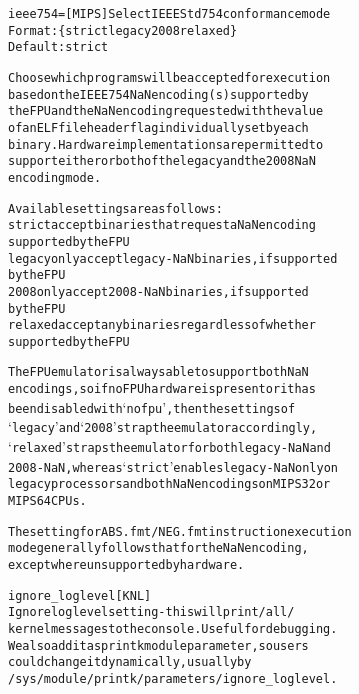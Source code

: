 \documentclass[a4paper,8pt,english]{sphinxmanual}
\begin{document}
\begin{alltt}
        ieee754=        {[}MIPS{]} Select IEEE Std 754 conformance mode
                        Format: \{ strict \textbar{} legacy \textbar{} 2008 \textbar{} relaxed \}
                        Default: strict

                        Choose which programs will be accepted for execution
                        based on the IEEE 754 NaN encoding(s) supported by
                        the FPU and the NaN encoding requested with the value
                        of an ELF file header flag individually set by each
                        binary.  Hardware implementations are permitted to
                        support either or both of the legacy and the 2008 NaN
                        encoding mode.

                        Available settings are as follows:
                        strict  accept binaries that request a NaN encoding
                                supported by the FPU
                        legacy  only accept legacy-NaN binaries, if supported
                                by the FPU
                        2008    only accept 2008-NaN binaries, if supported
                                by the FPU
                        relaxed accept any binaries regardless of whether
                                supported by the FPU

                        The FPU emulator is always able to support both NaN
                        encodings, so if no FPU hardware is present or it has
                        been disabled with `nofpu', then the settings of
                        `legacy' and `2008' strap the emulator accordingly,
                        `relaxed' straps the emulator for both legacy-NaN and
                        2008-NaN, whereas `strict' enables legacy-NaN only on
                        legacy processors and both NaN encodings on MIPS32 or
                        MIPS64 CPUs.

                        The setting for ABS.fmt/NEG.fmt instruction execution
                        mode generally follows that for the NaN encoding,
                        except where unsupported by hardware.

        ignore\_loglevel {[}KNL{]}
                        Ignore loglevel setting - this will print /all/
                        kernel messages to the console. Useful for debugging.
                        We also add it as printk module parameter, so users
                        could change it dynamically, usually by
                        /sys/module/printk/parameters/ignore\_loglevel.


\end{alltt}
\end{document}
